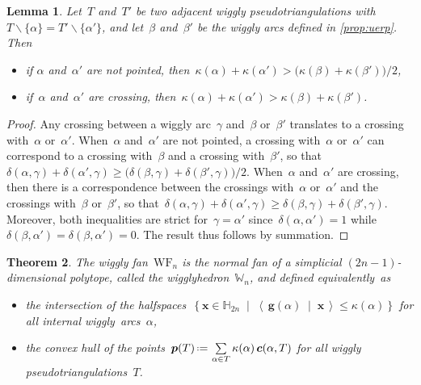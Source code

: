 \documentclass{amsart}
\newtheorem{theorem}{Theorem}%
\newtheorem{lemma}[theorem]{Lemma}
\theoremstyle{definition}
\newcommand{\HH}{\mathbb{H}} %
\renewcommand{\b}[1]{{\boldsymbol{#1}}} %
\newcommand{\set}[2]{\left\{ #1 \;\middle|\; #2 \right\}} %
\newcommand{\ssm}{\smallsetminus} %
\newcommand{\dotprod}[2]{\left\langle \, #1 \; \middle| \; #2 \, \right\rangle} %
\newcommand{\eqdef}{\mbox{\,\raisebox{0.2ex}{\scriptsize\ensuremath{\mathrm:}}\ensuremath{=}\,}} %
\newcommand{\darkblue}{\color{darkblue}} %
\newcommand{\defn}[1]{\textsl{\darkblue #1}} %
\newcommand{\polytope}[1]{\mathds{#1}} %
\newcommand{\wigglyFan}{\mathrm{WF}} %
\newcommand{\wigglyhedron}{\polytope{W}} %
\begin{document}
\begin{lemma}
\label{lem:wallCrossingInequalities}
Let~$T$ and~$T'$ be two adjacent wiggly pseudotriangulations with~$T \ssm \{\alpha\} = T' \ssm \{\alpha'\}$, and let~$\beta$ and~$\beta'$ be the wiggly arcs defined in \cref{prop:uerp}.
Then
\begin{itemize}
\item if $\alpha$ and~$\alpha'$ are not pointed, then~$\kappa(\alpha) + \kappa(\alpha') > \big( \kappa(\beta) + \kappa(\beta') \big) / 2$,
\item if~$\alpha$ and~$\alpha'$ are crossing, then~${\kappa(\alpha) + \kappa(\alpha') > \kappa(\beta) + \kappa(\beta')}$.
\end{itemize}
\end{lemma}

\begin{proof}
Any crossing between a wiggly arc~$\gamma$ and~$\beta$ or~$\beta'$ translates to a crossing with~$\alpha$ or~$\alpha'$.
When~$\alpha$ and~$\alpha'$ are not pointed, a crossing with~$\alpha$ or~$\alpha'$ can correspond to a crossing with~$\beta$ and a crossing with~$\beta'$, so that~$\delta(\alpha, \gamma) + \delta(\alpha', \gamma) \ge \big( \delta(\beta, \gamma) + \delta(\beta', \gamma) \big) / 2$.
When~$\alpha$ and~$\alpha'$ are crossing, then there is a correspondence between the crossings with~$\alpha$ or~$\alpha'$ and the crossings with~$\beta$ or~$\beta'$, so that~$\delta(\alpha, \gamma) + \delta(\alpha', \gamma) \ge \delta(\beta, \gamma) + \delta(\beta', \gamma)$.
Moreover, both inequalities are strict for~$\gamma = \alpha'$ since~$\delta(\alpha,\alpha') = 1$ while~$\delta(\beta, \alpha') = \delta(\beta, \alpha') = 0$.
The result thus follows by summation.
\end{proof}

\begin{theorem}
\label{thm:wigglyhedron}
The wiggly fan~$\wigglyFan_n$ is the normal fan of a simplicial $(2n-1)$-dimensional polytope, called the \defn{wigglyhedron}~$\wigglyhedron_n$, and defined equivalently~as
\begin{itemize}
\item the intersection of the halfspaces~$\set{\b{x} \!\in\! \HH_{2n}\!}{\!\dotprod{\b{g}(\alpha)}{\b{x}} \! \le \! \kappa(\alpha)}$ for all internal wiggly~arcs~$\alpha$,
\item the convex hull of the points~$\b{p}(T) \eqdef \sum\limits_{\alpha \in T} \kappa(\alpha) \, \b{c}(\alpha, T)$ for all wiggly pseudotriangulations~$T$.
\end{itemize}
\end{theorem}
\end{document}
